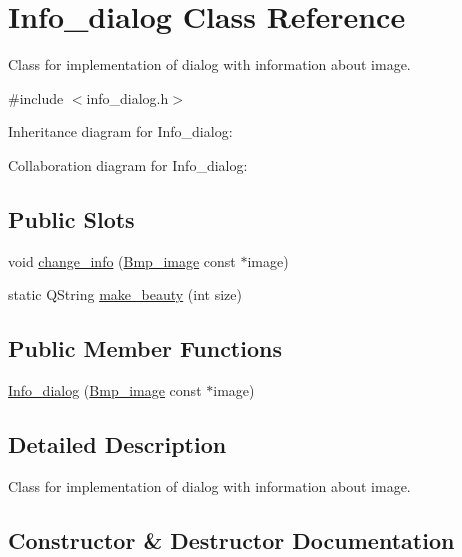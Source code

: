\hypertarget{classInfo__dialog}{}\section{Info\+\_\+dialog Class Reference}
\label{classInfo__dialog}


Class for implementation of dialog with information about image.  




{\ttfamily \#include $<$info\+\_\+dialog.\+h$>$}



Inheritance diagram for Info\+\_\+dialog\+:


Collaboration diagram for Info\+\_\+dialog\+:
\subsection*{Public Slots}
\begin{DoxyCompactItemize}
\item 
void \hyperlink{classInfo__dialog_a3fdd6756697e264f87520b1d10255d44}{change\+\_\+info} (\hyperlink{classBmp__image}{Bmp\+\_\+image} const $\ast$image)
\item 
static Q\+String \hyperlink{classInfo__dialog_aa0231c4bea209fef9fe69f9d3869bad4}{make\+\_\+beauty} (int size)
\end{DoxyCompactItemize}
\subsection*{Public Member Functions}
\begin{DoxyCompactItemize}
\item 
\hyperlink{classInfo__dialog_a26c9991147299264209685f08756dbd0}{Info\+\_\+dialog} (\hyperlink{classBmp__image}{Bmp\+\_\+image} const $\ast$image)
\end{DoxyCompactItemize}


\subsection{Detailed Description}
Class for implementation of dialog with information about image. 

\subsection{Constructor \& Destructor Documentation}
